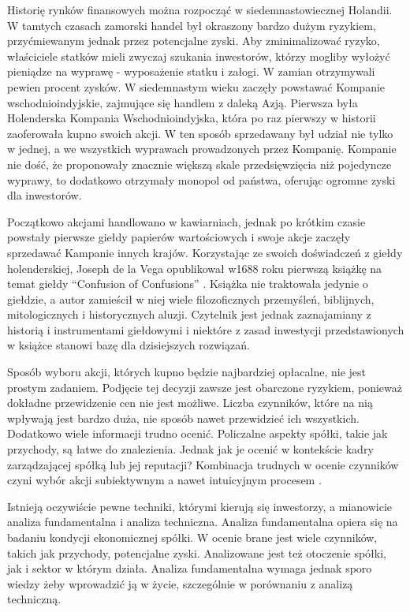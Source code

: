 \documentclass[twoside]{iisthesis}
\begin{document}
Historię rynków finansowych można rozpocząć w siedemnastowiecznej Holandii. W tamtych czasach zamorski handel był okraszony bardzo dużym ryzykiem, przyćmiewanym jednak przez potencjalne zyski. Aby zminimalizować ryzyko, właściciele statków mieli zwyczaj szukania inwestorów, którzy mogliby wyłożyć pieniądze na wyprawę - wyposażenie statku i załogi. W zamian otrzymywali pewien procent zysków. W siedemnastym wieku zaczęły powstawać Kompanie wschodnioindyjskie, zajmujące się handlem z daleką Azją. Pierwsza była Holenderska Kompania Wschodnioindyjska, która po raz pierwszy w historii zaoferowała kupno swoich akcji. W ten sposób sprzedawany był udział nie tylko w jednej, a we wszystkich wyprawach prowadzonych przez Kompanię. Kompanie nie dość, że proponowały znacznie większą skale przedsięwzięcia niż pojedyncze wyprawy, to dodatkowo otrzymały monopol od państwa, oferując ogromne zyski dla inwestorów.

Początkowo akcjami handlowano w kawiarniach, jednak po krótkim czasie powstały pierwsze giełdy papierów wartościowych i swoje akcje zaczęły sprzedawać Kampanie innych krajów. Korzystając ze swoich doświadczeń z giełdy holenderskiej, Joseph de la Vega opublikował w1688 roku pierwszą książkę na temat giełdy ``Confusion of Confusions''  \cite{Confusion}. Książka nie traktowała jedynie o giełdzie, a autor zamieścił w niej wiele filozoficznych przemyśleń, biblijnych, mitologicznych i historycznych aluzji. Czytelnik jest jednak zaznajamiany z historią i instrumentami giełdowymi i niektóre z zasad inwestycji przedstawionych w książce stanowi bazę dla dzisiejszych rozwiązań. 

Sposób wyboru akcji, których kupno będzie najbardziej opłacalne, nie jest prostym zadaniem. Podjęcie tej decyzji zawsze jest obarczone ryzykiem, ponieważ dokładne przewidzenie cen nie jest możliwe. Liczba czynników, które na nią wpływają jest bardzo duża, nie sposób nawet przewidzieć ich wszystkich. Dodatkowo wiele informacji trudno ocenić. Policzalne aspekty spółki, takie jak przychody, są łatwe do znalezienia. Jednak jak je ocenić w kontekście kadry zarządzającej spółką lub jej reputacji? Kombinacja trudnych w ocenie czynników czyni wybór akcji subiektywnym a nawet intuicyjnym procesem  \cite{stockPickingInvestopedia}. 

Istnieją oczywiście pewne techniki, którymi kierują się inwestorzy, a mianowicie analiza fundamentalna i analiza techniczna. Analiza fundamentalna opiera się na badaniu kondycji ekonomicznej spółki. W ocenie brane jest wiele czynników, takich jak przychody, potencjalne zyski. Analizowane jest też otoczenie spółki, jak i sektor w którym działa. Analiza fundamentalna wymaga jednak sporo wiedzy żeby wprowadzić ją w życie, szczególnie w porównaniu z analizą techniczną.
\end{document}
